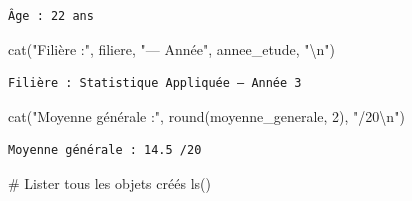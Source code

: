 \documentclass[
  french,
  11pt,
  a4paper,
]{article}
\newenvironment{Shaded}{}{}
\newcommand{\CommentTok}[1]{\textcolor[rgb]{0.42,0.45,0.49}{#1}}
\newcommand{\DecValTok}[1]{\textcolor[rgb]{0.00,0.36,0.77}{#1}}
\newcommand{\FunctionTok}[1]{\textcolor[rgb]{0.44,0.26,0.76}{#1}}
\newcommand{\NormalTok}[1]{\textcolor[rgb]{0.14,0.16,0.18}{#1}}
\newcommand{\SpecialCharTok}[1]{\textcolor[rgb]{0.00,0.36,0.77}{#1}}
\newcommand{\StringTok}[1]{\textcolor[rgb]{0.01,0.18,0.38}{#1}}
\begin{document}
\begin{verbatim}
Âge : 22 ans
\end{verbatim}

\begin{Shaded}
\begin{Highlighting}[]
\FunctionTok{cat}\NormalTok{(}\StringTok{"Filière :"}\NormalTok{, filiere, }\StringTok{"— Année"}\NormalTok{, annee\_etude, }\StringTok{"}\SpecialCharTok{\textbackslash{}n}\StringTok{"}\NormalTok{)}
\end{Highlighting}
\end{Shaded}

\begin{verbatim}
Filière : Statistique Appliquée — Année 3 
\end{verbatim}

\begin{Shaded}
\begin{Highlighting}[]
\FunctionTok{cat}\NormalTok{(}\StringTok{"Moyenne générale :"}\NormalTok{, }\FunctionTok{round}\NormalTok{(moyenne\_generale, }\DecValTok{2}\NormalTok{), }\StringTok{"/20}\SpecialCharTok{\textbackslash{}n}\StringTok{"}\NormalTok{)}
\end{Highlighting}
\end{Shaded}

\begin{verbatim}
Moyenne générale : 14.5 /20
\end{verbatim}

\begin{Shaded}
\begin{Highlighting}[]
\CommentTok{\# Lister tous les objets créés}
\FunctionTok{ls}\NormalTok{()}
\end{Highlighting}
\end{Shaded}
\end{document}
